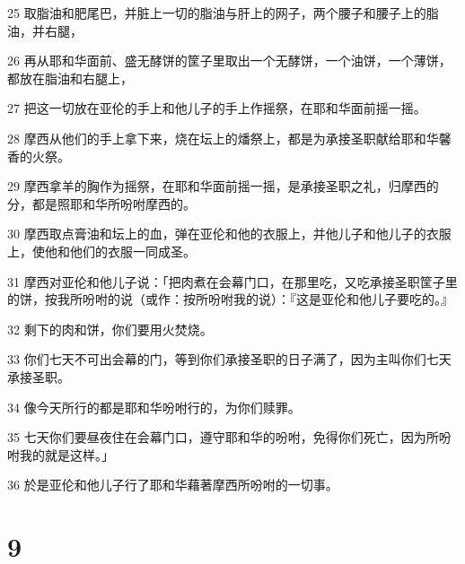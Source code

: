 \par 25 取脂油和肥尾巴，并脏上一切的脂油与肝上的网子，两个腰子和腰子上的脂油，并右腿，
\par 26 再从耶和华面前、盛无酵饼的筐子里取出一个无酵饼，一个油饼，一个薄饼，都放在脂油和右腿上，
\par 27 把这一切放在亚伦的手上和他儿子的手上作摇祭，在耶和华面前摇一摇。
\par 28 摩西从他们的手上拿下来，烧在坛上的燔祭上，都是为承接圣职献给耶和华馨香的火祭。
\par 29 摩西拿羊的胸作为摇祭，在耶和华面前摇一摇，是承接圣职之礼，归摩西的分，都是照耶和华所吩咐摩西的。
\par 30 摩西取点膏油和坛上的血，弹在亚伦和他的衣服上，并他儿子和他儿子的衣服上，使他和他们的衣服一同成圣。
\par 31 摩西对亚伦和他儿子说：「把肉煮在会幕门口，在那里吃，又吃承接圣职筐子里的饼，按我所吩咐的说（或作：按所吩咐我的说）：『这是亚伦和他儿子要吃的。』
\par 32 剩下的肉和饼，你们要用火焚烧。
\par 33 你们七天不可出会幕的门，等到你们承接圣职的日子满了，因为主叫你们七天承接圣职。
\par 34 像今天所行的都是耶和华吩咐行的，为你们赎罪。
\par 35 七天你们要昼夜住在会幕门口，遵守耶和华的吩咐，免得你们死亡，因为所吩咐我的就是这样。」
\par 36 於是亚伦和他儿子行了耶和华藉著摩西所吩咐的一切事。

\chapter{9}

